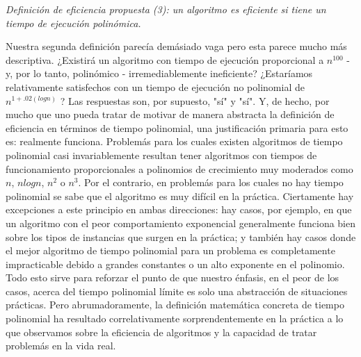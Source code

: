 \documentclass[a4paper]{article}
\begin{document}
\begin{center}\textit{Definición de eficiencia propuesta (3): un algoritmo es eficiente si tiene un tiempo de ejecución polinómica.}\end{center}    
    
Nuestra segunda definición parecía demásiado vaga pero esta parece mucho más descriptiva. ¿Existirá un algoritmo con tiempo de ejecución proporcional a $n^{100}$ - y, por lo tanto, polinómico - irremediablemente ineficiente? ¿Estaríamos relativamente satisfechos con un tiempo de ejecución no polinomial de $n^{1+.02(log n)}$ ? Las respuestas son, por supuesto, "sí" y "sí". Y, de hecho, por mucho que uno pueda tratar de motivar de manera abstracta la definición de eficiencia en términos de tiempo polinomial, una justificación primaria para esto es: realmente funciona. Problemás para los cuales existen algoritmos de tiempo polinomial casi invariablemente resultan tener algoritmos con tiempos de funcionamiento proporcionales a polinomios de crecimiento muy moderados como $n$, $nlog n$, $n^2$ o $n^3$. Por el contrario, en problemás para los cuales no hay tiempo polinomial se sabe que el algoritmo es muy difícil en la práctica. Ciertamente hay excepciones a este principio en ambas direcciones: hay casos, por ejemplo, en que un algoritmo con el peor comportamiento exponencial generalmente funciona bien sobre los tipos de instancias que surgen en la práctica; y también hay casos donde el mejor algoritmo de tiempo polinomial para un problema es completamente impracticable debido a grandes constantes o un alto exponente en el polinomio. Todo esto sirve para reforzar el punto de que nuestro énfasis, en el peor de los casos, acerca del tiempo polinomial límite es solo una abstracción de situaciones prácticas. Pero abrumadoramente, la definición matemática concreta de tiempo polinomial ha resultado correlativamente sorprendentemente en la práctica a lo que observamos sobre la eficiencia de algoritmos y la capacidad de tratar problemás en la vida real.\\
\end{document}
